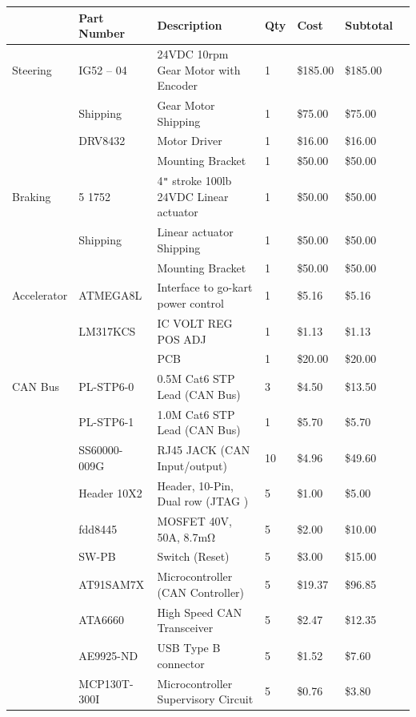 \begin{table}[h]
  \small
  \begin{center}
    \begin{tabular}{ | l | l | p{} | l | l | l | l | }
      \hline
      & Part Number & Description & Qty & Cost & Subtotal \\
      \hline
      Steering & IG52 – 04 & 24VDC 10rpm Gear Motor with Encoder & 1 & \$185.00 & \$185.00 \\
      & Shipping & Gear Motor Shipping & 1 & \$75.00 & \$75.00 \\
      & DRV8432 & Motor Driver & 1 & \$16.00 & \$16.00 \\
      &  & Mounting Bracket & 1 & \$50.00 & \$50.00 \\
      \hline
      Braking & 5 1752 & 4\texttt{"} stroke 100lb 24VDC Linear actuator  & 1 & \$50.00 & \$50.00 \\
      & Shipping & Linear actuator Shipping & 1 & \$50.00 & \$50.00 \\
      &  & Mounting Bracket & 1 & \$50.00 & \$50.00 \\
      \hline
      Accelerator & ATMEGA8L & Interface to go-kart power control & 1 & \$5.16 & \$5.16 \\
      & LM317KCS & IC VOLT REG POS ADJ & 1 & \$1.13 & \$1.13 \\
      &  & PCB & 1 & \$20.00 & \$20.00 \\
      \hline
      CAN Bus & PL-STP6-0 & 0.5M Cat6 STP Lead (CAN Bus) & 3 & \$4.50 & \$13.50 \\
      & PL-STP6-1 & 1.0M Cat6 STP Lead (CAN Bus) & 1 & \$5.70 & \$5.70 \\
      & SS60000-009G & RJ45 JACK (CAN Input/output) & 10 & \$4.96 & \$49.60 \\
      & Header 10X2 & Header, 10-Pin, Dual row (JTAG ) & 5 & \$1.00 & \$5.00 \\
      & fdd8445 & MOSFET 40V, 50A, 8.7mΩ & 5 & \$2.00 & \$10.00 \\
      & SW-PB & Switch (Reset) & 5 & \$3.00 & \$15.00 \\
      & AT91SAM7X & Microcontroller (CAN Controller) & 5 & \$19.37 & \$96.85 \\
      & ATA6660 & High Speed CAN Transceiver & 5 & \$2.47 & \$12.35 \\
      & AE9925-ND & USB Type B connector & 5 & \$1.52 & \$7.60 \\
      & MCP130T-300I & Microcontroller Supervisory Circuit & 5 & \$0.76 & \$3.80 \\

\end{tabular}
\end{center}
\end{table}
